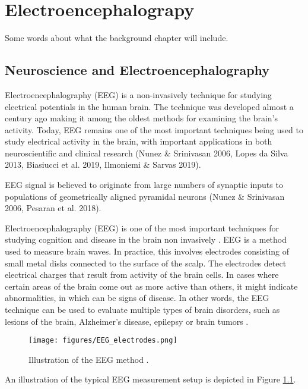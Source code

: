 \documentclass[a4paper, UKenglish, 11pt]{uiomaster}
\begin{document}
\chapter{Electroencephalograpy}
Some words about what the background chapter will include.

\section{Neuroscience and Electroencephalography}

Electroencephalography (EEG) is a non-invasively technique for studying electrical potentials in the human brain. The technique was developed almost a century ago making it among the oldest methods for examining the brain's activity. Today, EEG remains one of the most important techniques being used to study electrical activity in the brain, with important applications in both neuroscientific and clinical research (Nunez & Srinivasan 2006, Lopes da Silva 2013, Biasiucci et al. 2019, Ilmoniemi & Sarvas 2019).

EEG signal is believed to originate from large numbers of synaptic inputs to populations of geometrically aligned pyramidal neurons (Nunez & Srinivasan 2006, Pesaran et al. 2018).

Electroencephalography (EEG) is one of the most important techniques for studying cognition and disease in the brain non invasively \cite{95}. EEG is a method used to measure brain waves. In practice, this involves electrodes consisting of small metal disks connected to the surface of the scalp. The electrodes detect electrical charges that result from activity of the brain cells. In cases where certain areas of the brain come out as more active than others, it might indicate abnormalities, in which can be signs of disease. In other words, the EEG technique can be used to evaluate multiple types of brain disorders, such as lesions of the brain, Alzheimer's disease, epilepsy or brain tumors \cite{96}.

\begin{figure}[H]
    \centering
    \texttt{[image: figures/EEG\_electrodes.png]}
    \caption{Illustration of the EEG method \cite{97}.}
    \label{fig:EEG}
\end{figure}

An illustration of the typical EEG measurement setup is depicted in Figure \ref{fig:EEG}.
\end{document}
